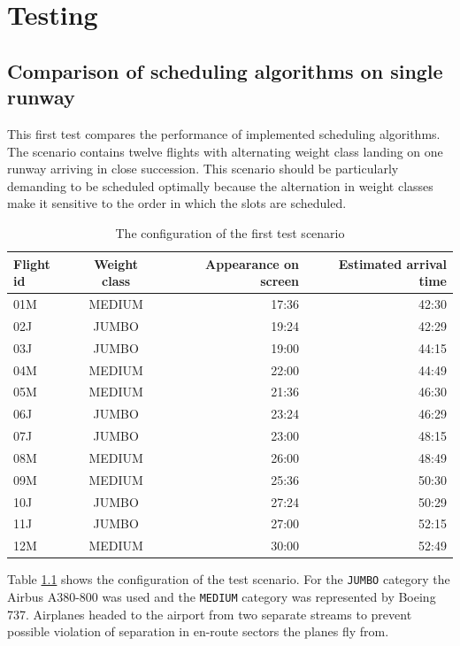 \chapter{Testing}


\section{Comparison of scheduling algorithms on single runway}

This first test compares the performance of implemented scheduling algorithms. The scenario contains twelve flights with alternating weight class landing on one runway arriving in close succession. This scenario should be particularly demanding to be scheduled optimally because the alternation in weight classes make it sensitive to the order in which the slots are scheduled.

\begin{table}[h]
  \centering
\begin{tabular}{ | l | c | r | r | }
\hline
Flight id	& Weight class	& Appearance on screen & Estimated arrival time	\\
\hline
01M	& MEDIUM	& 17:36	& 42:30	\\
02J	& JUMBO		& 19:24	& 42:29	\\
03J	& JUMBO		& 19:00	& 44:15	\\
04M	& MEDIUM	& 22:00	& 44:49	\\
05M	& MEDIUM	& 21:36	& 46:30	\\
06J	& JUMBO		& 23:24	& 46:29	\\
07J	& JUMBO		& 23:00	& 48:15	\\
08M	& MEDIUM	& 26:00	& 48:49	\\
09M	& MEDIUM	& 25:36	& 50:30	\\
10J	& JUMBO		& 27:24	& 50:29	\\
11J	& JUMBO		& 27:00	& 52:15	\\
12M	& MEDIUM	& 30:00	& 52:49	\\
\hline
\end{tabular}
  \caption{The configuration of the first test scenario}
  \label{tab:config1}
\end{table}

Table \ref{tab:config1} shows the configuration of the test scenario. For the \texttt{JUMBO} category the Airbus A380-800 was used and the \texttt{MEDIUM} category was represented by Boeing 737. Airplanes headed to the airport from two separate streams to prevent possible violation of separation in en-route sectors the planes fly from.

